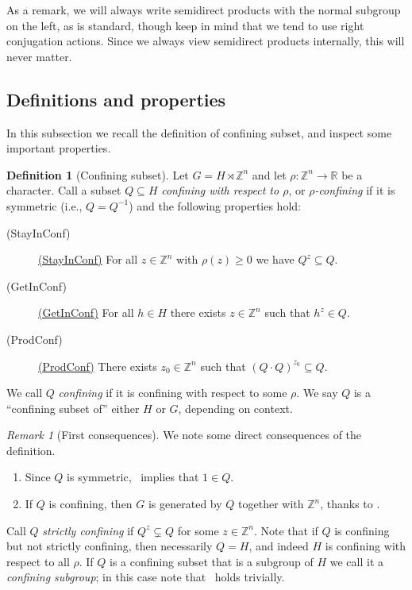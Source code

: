 \documentclass[10pt,a4paper]{article}
\theoremstyle{definition}
\newtheorem{defi}[cdrthm]{Definition}
\theoremstyle{remark}
\newtheorem{rema}[cdrthm]{Remark}
\newcommand{\listlabel}[1]{
  \item[\quad(#1)]\hypertarget{#1}{}\global\expandafter\def\csname #1\endcsname{\hyperlink{#1}{(#1)}}}
\newcommand{\Z}{\mathbb{Z}}
\newcommand{\R}{\mathbb{R}}
\theoremstyle{plain}
\begin{document}
As a remark, we will always write semidirect products with the normal subgroup on the left, as is standard, though keep in mind that we tend to use right conjugation actions. Since we always view semidirect products internally, this will never matter.


\subsection{Definitions and properties}\label{ssec:confining_defs}

In this subsection we recall the definition of confining subset, and inspect some important properties.

\begin{defi}[Confining subset]\label{def:confining}
Let $G=H\rtimes \Z^n$ and let $\rho\colon \Z^n \to\R$ be a character. Call a subset $Q\subseteq H$ \emph{confining with respect to $\rho$}, or \emph{$\rho$-confining} if it is symmetric (i.e., $Q = Q^{-1}$) and the following properties hold:
\begin{description}
    \listlabel{StayInConf} For all $z\in\Z^n$ with $\rho(z)\ge 0$ we have $Q^z\subseteq Q$.
    \listlabel{GetInConf} For all $h\in H$ there exists $z\in \Z^n$ such that $h^z\in Q$.
    \listlabel{ProdConf} There exists $z_0\in \Z^n$ such that $(Q\cdot Q)^{z_0}\subseteq Q$.
\end{description}
We call $Q$ \emph{confining} if it is confining with respect to some $\rho$. We say $Q$ is a ``confining subset of'' either $H$ or $G$, depending on context.
\end{defi}

\begin{rema}[First consequences]
\label{rem:conf:consequences}
We note some direct consequences of the definition.
\begin{enumerate}
\item Since $Q$ is symmetric, \ProdConf\ implies that $1\in Q$.
\item If $Q$ is confining, then $G$ is generated by $Q$ together with $\Z^n$, thanks to \GetInConf.
\end{enumerate}
\end{rema}

Call $Q$ \emph{strictly confining} if $Q^z\subsetneq Q$ for some $z\in\Z^n$. Note that if $Q$ is confining but not strictly confining, then necessarily $Q=H$, and indeed $H$ is confining with respect to all $\rho$. If $Q$ is a confining subset that is a subgroup of $H$ we call it a \emph{confining subgroup}; in this case note that \ProdConf\ holds trivially.
\end{document}
